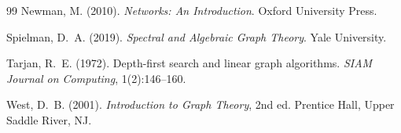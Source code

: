 \documentclass[12pt, a4paper]{article}
\theoremstyle{definition}
\theoremstyle{remark}
\begin{document}
\begin{thebibliography}{99}
Newman, M. (2010).
\newblock \textit{Networks: An Introduction}.
\newblock Oxford University Press.

Spielman, D.~A. (2019).
\newblock \textit{Spectral and Algebraic Graph Theory}.
\newblock Yale University.

Tarjan, R.~E. (1972).
\newblock Depth-first search and linear graph algorithms.
\newblock \textit{SIAM Journal on Computing}, 1(2):146--160.

West, D.~B. (2001).
\newblock \textit{Introduction to Graph Theory}, 2nd ed.
\newblock Prentice Hall, Upper Saddle River, NJ.

\end{thebibliography}
\end{document}
